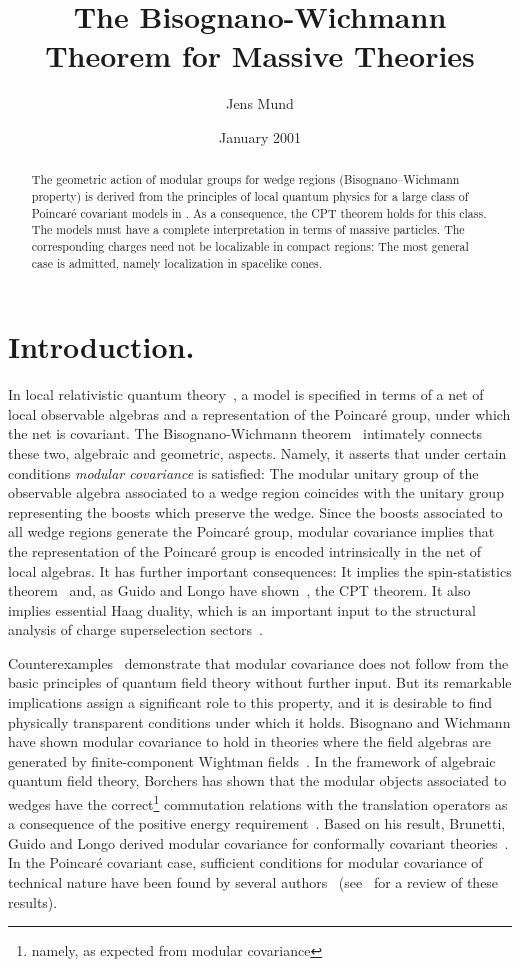 \documentclass[a4paper,reqno,11pt]{amsart}
\title%
{The Bisognano-Wichmann Theorem for Massive Theories}
\author{Jens Mund}
\date{January 2001}
\theoremstyle{plain}
\theoremstyle{definition}
\numberwithin{equation}{section}
\begin{document}
 
\begin{abstract}
The geometric action of modular groups for wedge regions 
(Bisognano--Wich\-mann property) 
is derived from the principles of local quantum physics 
for a large class of Poincar\'e covariant models in \coordHE{}. 
As a consequence, the CPT theorem holds for this class. 
The models must have a complete interpretation in terms of massive particles.  
The corresponding charges need not be localizable in 
compact regions: The most general case is admitted, namely 
localization in spacelike cones. 
\end{abstract}
\maketitle 
\section*{Introduction.} \label{secIntro} 
In local relativistic quantum theory~\cite{H96}, a model is specified
in terms of a net of local 
observable algebras and a representation of the Poincar\'e group,
under which the net is covariant. The Bisognano-Wichmann 
theorem~\cite{BiWi,BiWi2}  intimately connects 
these two, algebraic and geometric, aspects. 
Namely, it asserts that under certain conditions {\em modular
  covariance} is satisfied: 
The modular unitary group of the observable algebra 
associated to a wedge region coincides with the unitary group representing the 
boosts which preserve the wedge.  
Since the boosts associated to all wedge regions generate the
Poincar\'e group, modular covariance implies that the representation
of the Poincar\'e group is  encoded intrinsically in the net of local 
algebras. 
It has further important consequences: It implies the spin-statistics 
theorem~\cite{Kuck,GL} and, as Guido and Longo
have shown~\cite{GL}, the CPT theorem. It 
also implies essential Haag duality, which is an important input to 
the structural analysis of  charge superselection sectors~\cite{DHRIII,DHRIV}. 

Counterexamples~\cite{Yng94,BGL93,BDFS} demonstrate that modular covariance 
does not follow from the basic principles of quantum field theory 
without further input. But its remarkable implications assign a
significant role to this property, and it is 
desirable to find physically transparent conditions under which it
holds. 
Bi\-sognano and Wichmann have shown modular covariance 
to hold in theories where the field algebras are generated by finite-component 
Wightman fields~\cite{BiWi,BiWi2}. 
In the framework of algebraic quantum field theory,
Borchers  has shown
that the mo\-dular objects associated to wedges have the
correct\footnote{namely, as expected from modular covariance} 
commutation relations with the translation operators as a consequence
of the positive energy requirement~\cite{Borch92}. Based on his 
result, Brunetti, Guido and Longo derived modular covariance 
for conformally covariant theories~\cite{BGL93}. 
In the Poincar\'e covariant case, sufficient conditions for modular
covariance of technical nature have been found by several 
authors~\cite{Borch98,BY00,SHW98,Kuck00,GL00} 
(see~\cite{BY00} for a review of these results). 
\end{document}
